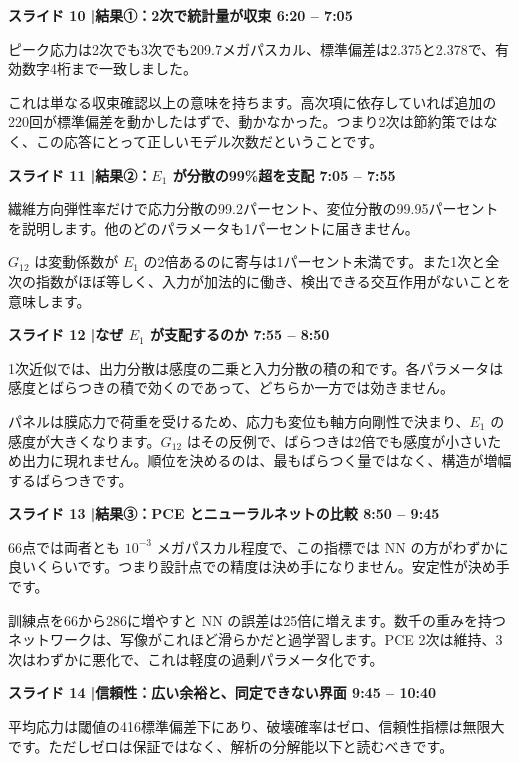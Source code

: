 \documentclass[11pt,a4paper]{ltjsarticle}
\newcommand{\slide}[3]{%
  \medskip
  \noindent\colorbox{luhblue}{\parbox{\dimexpr\linewidth-2\fboxsep}{%
    \color{white}\bfseries\small スライド #1 \quad|\quad #2 \hfill #3}}\par
  \nopagebreak\vspace{0.25em}}
\begin{document}
\slide{10}{結果①：2次で統計量が収束}{6:20 -- 7:05}

ピーク応力は2次でも3次でも209.7メガパスカル、標準偏差は2.375と2.378で、有効数字4桁まで一致しました。

これは単なる収束確認以上の意味を持ちます。高次項に依存していれば追加の220回が標準偏差を動かしたはずで、動かなかった。つまり2次は節約策ではなく、この応答にとって正しいモデル次数だということです。

\slide{11}{結果②：$E_1$ が分散の99\%超を支配}{7:05 -- 7:55}

繊維方向弾性率だけで応力分散の99.2パーセント、変位分散の99.95パーセントを説明します。他のどのパラメータも1パーセントに届きません。

$G_{12}$ は変動係数が $E_1$ の2倍あるのに寄与は1パーセント未満です。また1次と全次の指数がほぼ等しく、入力が加法的に働き、検出できる交互作用がないことを意味します。

\slide{12}{なぜ $E_1$ が支配するのか}{7:55 -- 8:50}

1次近似では、出力分散は感度の二乗と入力分散の積の和です。各パラメータは感度とばらつきの積で効くのであって、どちらか一方では効きません。

パネルは膜応力で荷重を受けるため、応力も変位も軸方向剛性で決まり、$E_1$ の感度が大きくなります。$G_{12}$ はその反例で、ばらつきは2倍でも感度が小さいため出力に現れません。順位を決めるのは、最もばらつく量ではなく、構造が増幅するばらつきです。

\slide{13}{結果③：PCE とニューラルネットの比較}{8:50 -- 9:45}

66点では両者とも $10^{-3}$ メガパスカル程度で、この指標では NN の方がわずかに良いくらいです。つまり設計点での精度は決め手になりません。安定性が決め手です。

訓練点を66から286に増やすと NN の誤差は25倍に増えます。数千の重みを持つネットワークは、写像がこれほど滑らかだと過学習します。PCE 2次は維持、3次はわずかに悪化で、これは軽度の過剰パラメータ化です。

\slide{14}{信頼性：広い余裕と、同定できない界面}{9:45 -- 10:40}

平均応力は閾値の416標準偏差下にあり、破壊確率はゼロ、信頼性指標は無限大です。ただしゼロは保証ではなく、解析の分解能以下と読むべきです。
\end{document}
